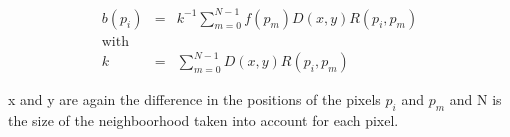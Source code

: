 \begin{equation}
\begin{aligned}
   b(p_i) &=& k^{-1}\sum_{m=0}^{N-1} f(p_m)D(x,y)R(p_i,p_m) \\
   \text{with} \\
   k &=& \sum_{m=0}^{N-1} D(x,y)R(p_i,p_m)
\end{aligned}
\end{equation}

x and y are again the difference in the positions of the pixels $p_i$ and $p_m$ and N is the size of the neighboorhood taken into account for each pixel.
